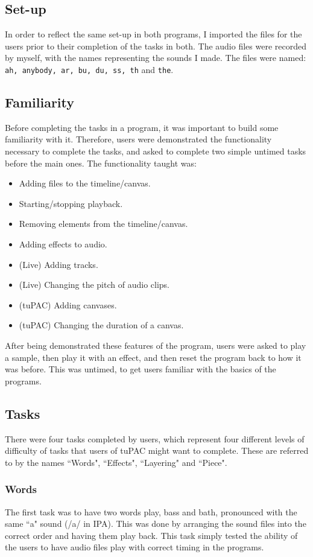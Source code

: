 \documentclass[12pt,a4paper,oneside,openright]{report}
\begin{document}
\subsection{Set-up}
In order to reflect the same set-up in both programs, I imported the files for the users prior to their completion of the tasks in both. The audio files were recorded by myself, with the names representing the sounds I made. The files were named: \verb|ah, anybody, ar, bu, du, ss, th| and \verb|the|.

\subsection{Familiarity}
Before completing the tasks in a program, it was important to build some familiarity with it. Therefore, users were demonstrated the functionality necessary to complete the tasks, and asked to complete two simple untimed tasks before the main ones. The functionality taught was:
\begin{itemize}
    \item Adding files to the timeline/canvas.
    \item Starting/stopping playback.
    \item Removing elements from the timeline/canvas.
    \item Adding effects to audio.
    \item (Live) Adding tracks.
    \item (Live) Changing the pitch of audio clips.
    \item (tuPAC) Adding canvases.
    \item (tuPAC) Changing the duration of a canvas.
\end{itemize}

After being demonstrated these features of the program, users were asked to play a sample, then play it with an effect, and then reset the program back to how it was before. This was untimed, to get users familiar with the basics of the programs.

\subsection{Tasks}
There were four tasks completed by users, which represent four different levels of difficulty of tasks that users of tuPAC might want to complete. These are referred to by the names ``Words", ``Effects", ``Layering" and ``Piece".

\subsubsection{Words}
The first task was to have two words play, bass and bath, pronounced with the same ``a" sound (/a/ in IPA). This was done by arranging the sound files into the correct order and having them play back. This task simply tested the ability of the users to have audio files play with correct timing in the programs.
\end{document}
